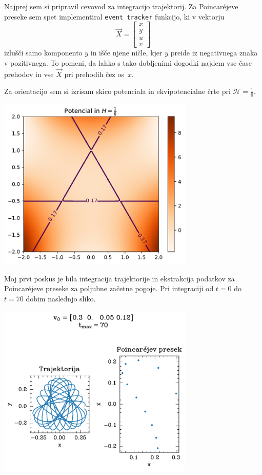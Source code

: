 Najprej sem si pripravil cevovod za integracijo trajektorij. Za Poincar\'{e}jeve preseke sem spet implementiral \texttt{event tracker} funkcijo, ki v vektorju
\[ \vec{X} = \begin{bmatrix}
x\\
y\\
u\\
v
\end{bmatrix} \]
izlušči samo komponento $y$ in išče njene ničle, kjer $y$ preide iz negativnega znaka v pozitivnega. To pomeni, da lahko s tako dobljenimi dogodki najdem vse čase prehodov in vse $\vec{X}$ pri prehodih čez os~$x$.

Za orientacijo sem si izrisam skico potenciala in ekvipotencialne črte pri $\mathcal{H} = \tfrac{1}{6}$.
\begin{center}
    \includegraphics[width=0.7\textwidth]{../images/2024-2-skica_potenciala.pdf}
\end{center}

Moj prvi poskus je bila integracija trajektorije in ekstrakcija podatkov za Poincar\'{e}jeve preseke za poljubne začetne pogoje. Pri integraciji od $t=0$ do $t=70$ dobim naslednjo sliko.
\begin{center}
    \includegraphics[width=0.7\textwidth]{../images/2-0-testna-orbita.pdf}
\end{center}

